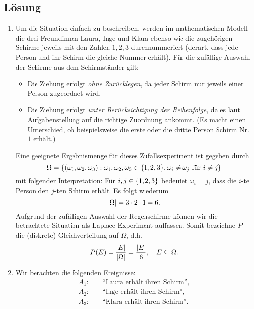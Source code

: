 \documentclass{exercise}
\begin{document}
    \subsection*{Lösung}
    \begin{enumerate}
        \item Um die Situation einfach zu beschreiben, werden im mathematischen Modell die drei Freundinnen Laura, Inge und Klara ebenso wie die zugehörigen Schirme jeweils mit den Zahlen \(1, 2, 3\) durchnummeriert (derart, dass jede Person und ihr Schirm die gleiche Nummer erhält).
        Für die zufällige Auswahl der Schirme aus dem Schirmständer gilt:
        \begin{itemize}
            \item Die Ziehung erfolgt \emph{ohne Zurücklegen}, da jeder Schirm nur jeweils einer Person zugeordnet wird.
            \item Die Ziehung erfolgt \emph{unter Berücksichtigung der Reihenfolge}, da es laut Aufgabenstellung auf die richtige Zuordnung ankommt. (Es macht einen Unterschied, ob beispielsweise die erste oder die dritte Person Schirm Nr. \(1\) erhält.)
        \end{itemize}
        Eine geeignete Ergebnismenge für dieses Zufallsexperiment ist gegeben durch
        \[
            \Omega = \braces*{\parentheses*{\omega_1, \omega_2, \omega_3} : \omega_1, \omega_2, \omega_3 \in \braces*{1, 2, 3}, \omega_i \ne \omega_j\text{ für }i \ne j}
        \]
        mit folgender Interpretation: Für \(i, j \in \braces*{1, 2, 3}\) bedeutet \(\omega_i = j\), dass die \(i\)-te Person den \(j\)-ten Schirm erhält.
        Es folgt wiederum
        \[
            \absolute*{\Omega} = 3 \cdot 2 \cdot 1 = 6.
        \]
        Aufgrund der zufälligen Auswahl der Regenschirme können wir die betrachtete Situation als Laplace-Experiment auffassen.
        Somit bezeichne \(P\) die (diskrete) Gleichverteilung auf \(\Omega\), d.h.
        \[
            P\parentheses*{E} = \frac{\absolute*{E}}{\absolute*{\Omega}} = \frac{\absolute*{E}}{6}, \quad E \subseteq \Omega.
        \]
        \item Wir berachten die folgenden Ereignisse:
        \begin{align*}
            A_1: \quad &\text{``Laura erhält ihren Schirm''},\\
            A_2: \quad &\text{``Inge erhält ihren Schirm''},\\
            A_3: \quad &\text{``Klara erhält ihren Schirm''}.
        \end{align*}

\end{enumerate}
\end{document}

